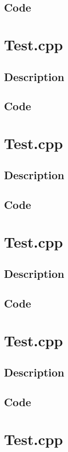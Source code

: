         \subsection{Code}
    \section{Test.cpp}
        \subsection{Description}
        \subsection{Code}
    \section{Test.cpp}
        \subsection{Description}
        \subsection{Code}
    \section{Test.cpp}
        \subsection{Description}
        \subsection{Code}
    \section{Test.cpp}
        \subsection{Description}
        \subsection{Code}
    \section{Test.cpp}
